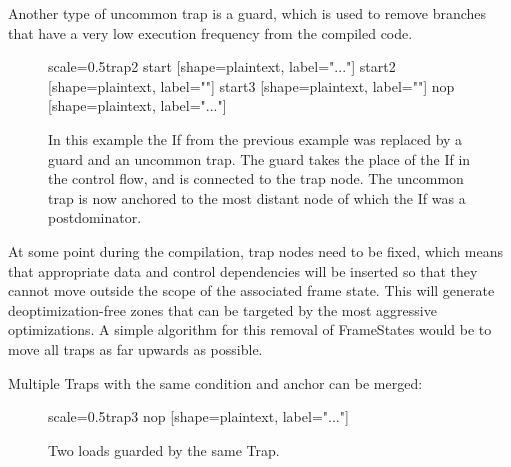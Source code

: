 \documentclass[twocolumn]{svjour3}
\begin{document}
Another type of uncommon trap is a guard, which is used to remove branches that have a very low execution frequency from the compiled code.

\begin{figure}[h]
  \label{fig:trap2}
  \centering
\begin{digraphenv}{scale=0.5}{trap2}
    start [shape=plaintext, label="..."]
    start2 [shape=plaintext, label=""]
    start3 [shape=plaintext, label=""]
    nop [shape=plaintext, label="..."]
\end{digraphenv}
  \caption{In this example the If from the previous example was replaced by a guard and an uncommon trap.
The guard takes the place of the If in the control flow, and is connected to the trap node.
The uncommon trap is now anchored to the most distant node of which the If was a postdominator.}
\end{figure}

At some point during the compilation, trap nodes need to be fixed, which means that appropriate data and control dependencies will be inserted so that they cannot move outside the scope of the associated frame state.
This will generate deoptimization-free zones that can be targeted by the most aggressive optimizations.
A simple algorithm for this removal of FrameStates would be to move all traps as far upwards as possible.


Multiple Traps with the same condition and anchor can be merged:

\begin{figure}[h]
  \label{fig:trap3}
  \centering
\begin{digraphenv}{scale=0.5}{trap3}
    nop [shape=plaintext, label="..."]
\end{digraphenv}
  \caption{Two loads guarded by the same Trap.}
\end{figure}
\end{document}
